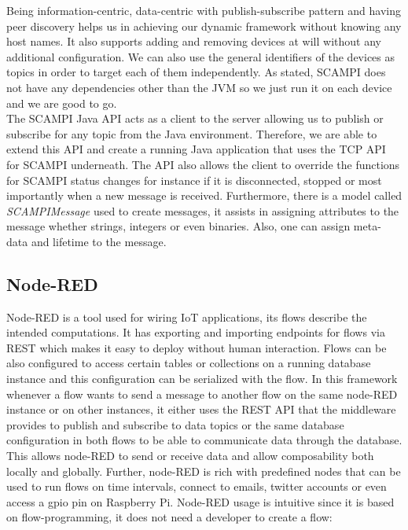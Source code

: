 \noindent Being information-centric, data-centric with publish-subscribe pattern and having peer discovery helps us in achieving our dynamic framework without knowing any host names. It  also supports adding and removing devices at will without any additional configuration. We can also use the general identifiers of the devices as topics in order to target each of them independently. As stated, SCAMPI does not have any dependencies other than the JVM so we just run it on each device and we are  good to go. \\


\noindent The SCAMPI Java API acts as a client to the server allowing us to publish or subscribe for any topic from the Java environment. Therefore, we are able to extend this API and create a running Java application that uses the TCP API for SCAMPI underneath. The API also allows the client to override the functions for SCAMPI status changes  for instance if it is disconnected, stopped or most importantly when a new message is received. Furthermore, there is a model called \textit{SCAMPIMessage} used to create messages, it assists in assigning attributes to the message whether strings, integers or even binaries. Also, one can assign meta-data and lifetime to the message.


\subsection{Node-RED}

Node-RED is a tool used for wiring IoT applications, its flows describe the intended computations. It has exporting and importing endpoints for flows via REST which makes it easy to deploy without human interaction.  Flows can be also configured to access certain tables or collections on a running database instance and this configuration can be serialized with the flow. In this framework whenever a flow wants to send a message to another flow on the same node-RED instance or on other instances, it either uses the REST API that the middleware provides to publish and subscribe to data topics or the same database configuration in both flows to be able to communicate data through the database. This allows node-RED to send or receive data and allow composability both locally and globally.  Further, node-RED is rich with predefined nodes that  can be used to run flows on time intervals, connect to emails, twitter accounts or even access a gpio pin on Raspberry Pi. Node-RED usage is intuitive since it is based on flow-programming, it does not need a developer to create a flow:

